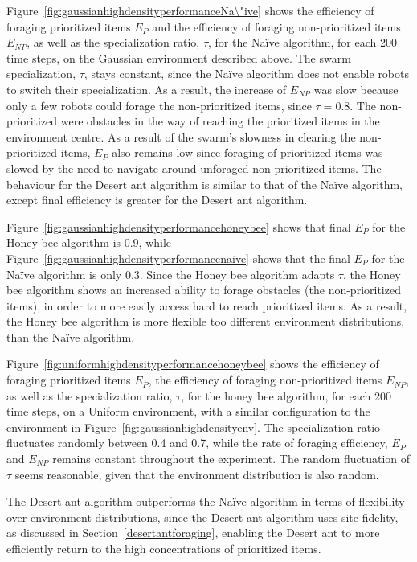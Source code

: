 Figure~\ref{fig:gaussianhighdensityperformanceNa\"ive} shows the efficiency of foraging prioritized items $E_P$ and the efficiency of foraging non-prioritized items $E_{NP}$, as well as the specialization ratio, $\tau$, for the Na\"ive algorithm, for each 200 time steps, on the Gaussian environment described above. The swarm specialization, $\tau$, stays constant, since the Na\"ive algorithm does not enable robots to switch their specialization. As a result, the increase of $E_{NP}$ was slow because only a few robots could forage the non-prioritized items, since $\tau=0.8$. The non-prioritized were obstacles in the way of reaching the prioritized items in the environment centre. As a result of the swarm's slowness in clearing the non-prioritized items, $E_P$ also remains low since foraging of prioritized items was slowed by the need to navigate around unforaged non-prioritized items. The behaviour for the Desert ant algorithm is similar to that of the Na\"ive algorithm, except final efficiency is greater for the Desert ant algorithm.

Figure~\ref{fig:gaussianhighdensityperformancehoneybee} shows that final $E_P$ for the Honey bee algorithm is 0.9, while Figure~\ref{fig:gaussianhighdensityperformancenaive} shows that the final $E_P$ for the Na\"ive algorithm is only 0.3. Since the Honey bee algorithm adapts $\tau$, the Honey bee algorithm shows an increased ability to forage obstacles (the non-prioritized items), in order to more easily access hard to reach prioritized items. As a result, the Honey bee algorithm is more flexible too different environment distributions, than the Na\"ive algorithm.

Figure~\ref{fig:uniformhighdensityperformancehoneybee} shows the efficiency of foraging prioritized items $E_P$, the efficiency of foraging non-prioritized items $E_{NP}$, as well as the specialization ratio, $\tau$, for the honey bee algorithm, for each 200 time steps, on a Uniform environment, with a similar configuration to the environment in Figure~\ref{fig:gaussianhighdensityenv}. The specialization ratio fluctuates randomly between 0.4 and 0.7, while the rate of foraging efficiency, $E_P$ and $E_{NP}$ remains constant throughout the experiment. The random fluctuation of $\tau$ seems reasonable, given that the environment distribution is also random.

The Desert ant algorithm outperforms the Na\"ive algorithm in terms of flexibility over environment distributions, since the Desert ant algorithm uses site fidelity, as discussed in Section~\ref{desertantforaging}, enabling the Desert ant to more efficiently return to the high concentrations of prioritized items.

